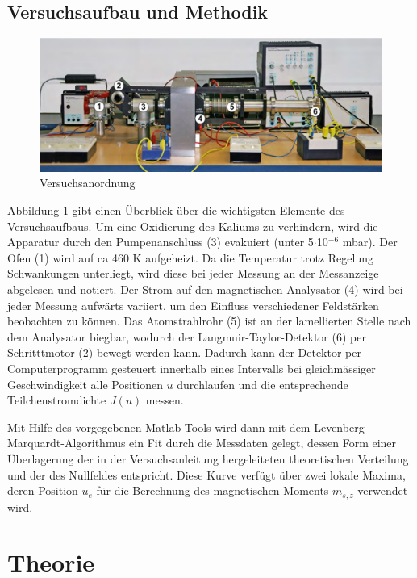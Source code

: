 \documentclass[a4paper,parskip,11pt, DIV12]{scrreprt}
\begin{document}
\section{Versuchsaufbau und Methodik}
	\begin{figure}[H]
\centering
\includegraphics[keepaspectratio,width=\textwidth,height=\textheight]{Setup}
\caption[Setup]{Versuchsanordnung}
\label{Abb:Setup}
\end{figure}
Abbildung \ref{Abb:Setup} gibt einen Überblick über die wichtigsten Elemente des Versuchsaufbaus. Um eine Oxidierung des Kaliums zu verhindern, wird die Apparatur durch den Pumpenanschluss (3) evakuiert (unter 5$\cdot$10$^{-6}$ mbar). Der Ofen (1) wird auf ca 460 K aufgeheizt. Da die Temperatur trotz Regelung Schwankungen unterliegt, wird diese bei jeder Messung an der Messanzeige abgelesen und notiert. Der Strom auf den magnetischen Analysator (4) wird bei jeder Messung aufwärts variiert, um den Einfluss verschiedener Feldstärken beobachten zu können. Das Atomstrahlrohr (5) ist an der lamellierten Stelle nach dem Analysator biegbar, wodurch der Langmuir-Taylor-Detektor (6) per Schritttmotor (2) bewegt werden kann. Dadurch kann der Detektor per Computerprogramm gesteuert innerhalb eines Intervalls bei gleichmässiger Geschwindigkeit alle Positionen $u$ durchlaufen und die entsprechende Teilchenstromdichte $J(u)$ messen. 

	Mit Hilfe des vorgegebenen Matlab-Tools wird dann mit dem Levenberg-Marquardt-Algorithmus ein Fit durch die Messdaten gelegt, dessen Form einer Überlagerung der in der Versuchsanleitung hergeleiteten theoretischen Verteilung und der des Nullfeldes entspricht. Diese Kurve verfügt über zwei lokale Maxima, deren Position $u_e$ für die Berechnung des magnetischen Moments $m_{s,z}$ verwendet wird.

\clearpage


\chapter{Theorie} \label{Datenanalyse}
\end{document}

